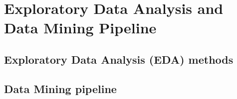 \section{Exploratory Data Analysis and Data Mining Pipeline}
\label{sec:eda}

\subsection{Exploratory Data Analysis (EDA) methods}


\newpage
\subsection{Data Mining pipeline}